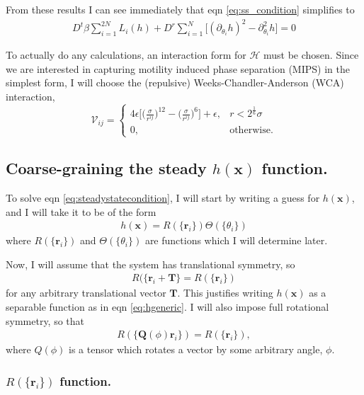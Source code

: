 \documentclass{article}
\begin{document}
From these results I can see immediately that eqn \ref{eq:ss_condition} simplifies to
\begin{align}\label{eq:steadystatecondition}
  D^t\beta\sum_{i=1}^{2N}L_i(h)+D^r\sum_{i=1}^{N}\big[(\partial_{\theta_i}h)^2
  -\partial_{\theta_i}^2h\big]=0
\end{align}

To actually do any calculations, an interaction form for $\mathcal{H}$ must be chosen. Since we
are interested in capturing motility induced phase separation (MIPS) in the simplest form, I
will choose the (repulsive) Weeks-Chandler-Anderson (WCA) interaction,
\begin{equation}\label{eq:WCAapprox}
  \mathcal{V}_{ij} =
  \begin{cases}
    4\epsilon\bigg[\bigg(\frac{\sigma}{r^{ij}}\bigg)^{12}
    -\bigg(\frac{\sigma}{r^{ij}}\bigg)^6\bigg]+\epsilon, & r<2^{\frac{1}{6}}\sigma \\
    0, & \mathrm{otherwise}.
  \end{cases}
\end{equation}


\subsection{Coarse-graining the steady $h(\bm{x})$ function.}

To solve eqn \ref{eq:steadystatecondition}, I will start by writing a guess for $h(\bm{x})$, and I
will take it to be of the form
\begin{align}\label{eq:hgeneric}
  h(\bm{x})=R(\{\bm{r}_i\})\Theta(\{\theta_i\})
\end{align}
where $R(\{\bm{r}_i\})$ and $\Theta(\{\theta_i\})$ are functions which I will determine later.

Now, I will assume that the system has translational symmetry, so
\begin{align}\label{eq:Rtranssym}
  R(\{\bm{r}_i+\bm{T}\}=R(\{\bm{r}_i\})
\end{align}
for any arbitrary translational vector $\bm{T}$. This justifies writing $h(\bm{x})$ as a separable
function as in eqn \ref{eq:hgeneric}. I will also impose full rotational symmetry, so that
\begin{align}\label{eq:hrotsymm}
  R(\{\bm{Q}(\phi)\bm{r}_i\})=R(\{\bm{r}_i\}),
\end{align}
where $Q(\phi)$ is a tensor which rotates a vector by some arbitrary angle, $\phi$.

\subsubsection{$R(\{\bm{r}_i\})$ function.}
\end{document}
